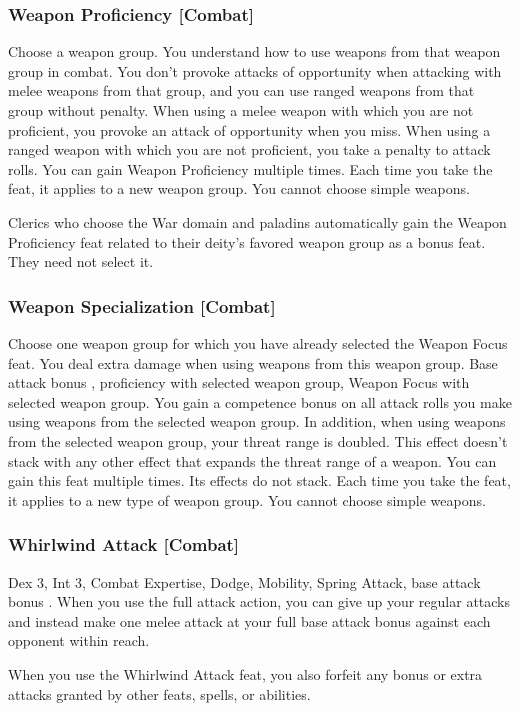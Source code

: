 \subsubsection{Weapon Proficiency [Combat]}
Choose a weapon group. You understand how to use weapons from that weapon group in combat.
 You don't provoke attacks of opportunity when attacking with melee weapons from that group, and you can use ranged weapons from that group without penalty.
 When using a melee weapon with which you are not proficient, you provoke an attack of opportunity when you miss. When using a ranged weapon with which you are not proficient, you take a  penalty to attack rolls.
 You can gain Weapon Proficiency multiple times. Each time you take the feat, it applies to a new weapon group. You cannot choose simple weapons.
\par Clerics who choose the War domain and paladins automatically gain the Weapon Proficiency feat related to their deity's favored weapon group as a bonus feat. They need not select it.

\subsubsection{Weapon Specialization [Combat]}
Choose one weapon group for which you have already selected the Weapon Focus feat. You deal extra damage when using weapons from this weapon group.
 Base attack bonus , proficiency with selected weapon group, Weapon Focus with selected weapon group.
 You gain a  competence bonus on all attack rolls you make using weapons from the selected weapon group. In addition, when using weapons from the selected weapon group, your threat range is doubled. This effect doesn't stack with any other effect that expands the threat range of a weapon.
 You can gain this feat multiple times. Its effects do not stack. Each time you take the feat, it applies to a new type of weapon group. You cannot choose simple weapons.

\subsubsection{Whirlwind Attack [Combat]}
 Dex 3, Int 3, Combat Expertise, Dodge, Mobility, Spring Attack, base attack bonus .
 When you use the full attack action, you can give up your regular attacks and instead make one melee attack at your full base attack bonus against each opponent within reach.
\par When you use the Whirlwind Attack feat, you also forfeit any bonus or extra attacks granted by other feats, spells, or abilities.

